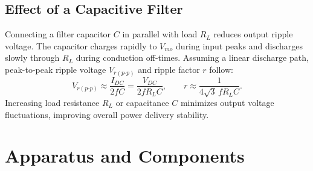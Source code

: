\subsection{Effect of a Capacitive Filter}
Connecting a filter capacitor $C$ in parallel with load $R_L$ reduces output ripple voltage. The capacitor charges rapidly to $V_{mo}$ during input peaks and discharges slowly through $R_L$ during conduction off-times. Assuming a linear discharge path, peak-to-peak ripple voltage $V_{r(p\text{-}p)}$ and ripple factor $r$ follow:
\[
V_{r(p\text{-}p)} \approx \frac{I_{DC}}{2fC} = \frac{V_{DC}}{2fR_LC}, \qquad r \approx \frac{1}{4\sqrt{3}\,fR_LC}.
\]
Increasing load resistance $R_L$ or capacitance $C$ minimizes output voltage fluctuations, improving overall power delivery stability.

\section{Apparatus and Components}
\begin{table}[h!]
	\centering
	\caption{List of Equipment and Components Used}
	\vspace{2mm}
	\label{tab:apparatus6}
\end{table}

